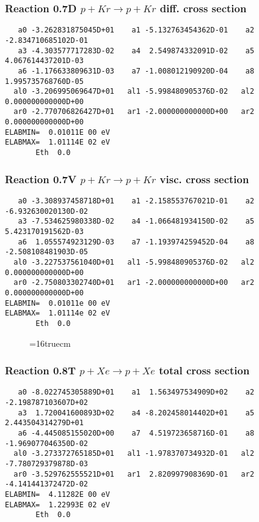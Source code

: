 \documentclass[12pt,dvipdfmx]{article}
\begin{document}
\subsubsection{
Reaction 0.7D    $p + Kr \rightarrow p + Kr  $ diff. cross
section }


\begin{small}\begin{verbatim}
   a0 -3.262831875045D+01    a1 -5.132763454362D-01    a2 -2.834710685102D-01
   a3 -4.303577717283D-02    a4  2.549874332091D-02    a5  4.067614437201D-03
   a6 -1.176633809631D-03    a7 -1.008012190920D-04    a8  1.995735768760D-05
  al0 -3.206995069647D+01   al1 -5.998480905376D-02   al2  0.000000000000D+00
  ar0 -2.770706826427D+01   ar1 -2.000000000000D+00   ar2  0.000000000000D+00
ELABMIN=  0.01011E 00 eV
ELABMAX=  1.01114E 02 eV
       Eth  0.0
\end{verbatim}\end{small}

\subsubsection{
Reaction 0.7V   $ p + Kr \rightarrow p + Kr  $ visc. cross
section }


\begin{small}\begin{verbatim}
   a0 -3.308937458718D+01    a1 -2.158553767021D-01    a2 -6.932630020130D-02
   a3 -7.534625980338D-02    a4 -1.066481934150D-02    a5  5.423170191562D-03
   a6  1.055574923129D-03    a7 -1.193974259452D-04    a8 -2.508108481903D-05
  al0 -3.227537561040D+01   al1 -5.998480905376D-02   al2  0.000000000000D+00
  ar0 -2.750803302740D+01   ar1 -2.000000000000D+00   ar2  0.000000000000D+00
ELABMIN=  0.01011e 00 eV
ELABMAX=  1.01114e 02 eV
       Eth  0.0
\end{verbatim}\end{small}


\begin{figure} \label{0.7}
\epsfxsize=16truecm
\end{figure}
\newpage


\subsubsection{
Reaction 0.8T   $ p + Xe \rightarrow p + Xe $ total cross
section }



\begin{small}\begin{verbatim}
   a0 -8.022745305889D+01    a1  1.563497534909D+02    a2 -2.198787103607D+02
   a3  1.720041600893D+02    a4 -8.202458014402D+01    a5  2.443504314279D+01
   a6 -4.445085155020D+00    a7  4.519723658716D-01    a8 -1.969077046350D-02
  al0 -3.273372765185D+01   al1 -1.978370734932D-01   al2 -7.780729379878D-03
  ar0 -3.529762555521D+01   ar1  2.820997908369D-01   ar2 -4.141441372472D-02
ELABMIN=  4.11282E 00 eV
ELABMAX=  1.22993E 02 eV
       Eth  0.0
\end{verbatim}\end{small}
\end{document}
